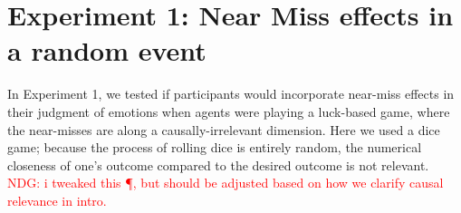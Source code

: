 \documentclass[10pt,letterpaper]{article}
\newcommand{\red}[1]{\textcolor{Red}{#1}}
\begin{document}
%
%
%
%












\section{Experiment 1: Near Miss effects in a random event}

In Experiment 1, we tested if participants would incorporate near-miss effects in their judgment of emotions when agents were playing a luck-based game, where the near-misses are along a causally-irrelevant dimension. Here we used a dice game; because the process of rolling dice is entirely random, the numerical closeness of one's outcome compared to the desired outcome is not relevant. \red{NDG: i tweaked this \P, but should be adjusted based on how we clarify causal relevance in intro.}
\end{document}
